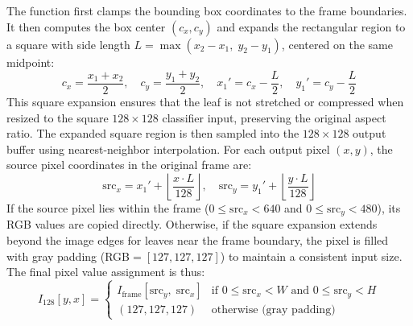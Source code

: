 The function first clamps the bounding box coordinates to the frame boundaries. It then computes the box center $(c_x, c_y)$ and expands the rectangular region to a square with side length $L = \max(x_2 - x_1,\; y_2 - y_1)$, centered on the same midpoint:
\begin{equation}
c_x = \frac{x_1 + x_2}{2}, \quad c_y = \frac{y_1 + y_2}{2}, \quad
x_1' = c_x - \frac{L}{2}, \quad y_1' = c_y - \frac{L}{2}
\end{equation}
This square expansion ensures that the leaf is not stretched or compressed when resized to the square $128 \times 128$ classifier input, preserving the original aspect ratio. The expanded square region is then sampled into the $128 \times 128$ output buffer using nearest-neighbor interpolation. For each output pixel $(x, y)$, the source pixel coordinates in the original frame are:
\begin{equation}
\text{src}_x = x_1' + \left\lfloor \frac{x \cdot L}{128} \right\rfloor, \quad
\text{src}_y = y_1' + \left\lfloor \frac{y \cdot L}{128} \right\rfloor
\end{equation}
If the source pixel lies within the frame ($0 \leq \text{src}_x < 640$ and $0 \leq \text{src}_y < 480$), its RGB values are copied directly. Otherwise, if the square expansion extends beyond the image edges for leaves near the frame boundary, the pixel is filled with gray padding (RGB$=[127, 127, 127]$) to maintain a consistent input size. The final pixel value assignment is thus:
\begin{equation}
I_{128}[y, x] = 
\begin{cases}
I_{\text{frame}}[\text{src}_y,\; \text{src}_x] & \text{if } 0 \leq \text{src}_x < W \text{ and } 0 \leq \text{src}_y < H \\
(127, 127, 127) & \text{otherwise (gray padding)}
\end{cases}
\end{equation}

